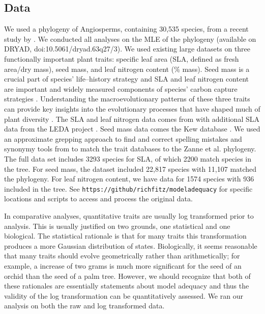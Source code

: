 \documentclass[a4paper,11pt]{article}
\begin{document}
\subsection{Data}
We used a phylogeny of Angiosperms, containing 30,535 species, from a recent study by \citet{Zanne2013}.  We conducted all analyses on the MLE of the phylogeny (available on DRYAD, doi:10.5061/dryad.63q27/3). We used existing large datasets on three functionally important plant traits: specific leaf area (SLA, defined as fresh area/dry mass), seed mass, and leaf nitrogen content (\% mass). Seed mass is a crucial part of species' life--history strategy \citep{Leishman2000, Westoby2002} and SLA and leaf nitrogen content are important and widely measured components of species' carbon capture strategies \citep{Wright2004}. Understanding the macroevolutionary patterns of these three traits can provide key insights into the evolutionary processes that have shaped much of plant diversity \citep{ksi}. The SLA and leaf nitrogen data comes from \citet{Wright2004} with additional SLA data from the LEDA project \citep{Kleyer2008}. Seed mass data comes the Kew database \citep{Kew2008}. We used an approximate grepping approach to find and correct spelling mistakes and synonymy tools from \citet{plantlist} to match the trait databases to the Zanne et al. phylogeny. 
The full data set includes 3293 species for SLA, of which 2200 match species in the \citet{Zanne2013} tree. For seed mass, the dataset included 22,817 species with 11,107 matched the phylogeny. For leaf nitrogen content, we have data for 1574 species with 936 included in the tree. 
%
See \texttt{https://github/richfitz/modeladequacy} for specific locations and scripts to access and process the original data. 

In comparative analyses, quantitative traits are usually log transformed prior to analysis. This is usually justified on two grounds, one statistical and one biological. The statistical rationale is that for many traits this transformation produces a more Gaussian distribution of states. Biologically, it seems reasonable that many traits should evolve geometrically rather than arithmetically; 
for example, a increase of two grams is much more significant for the seed of an orchid than the seed of a palm tree. However, we should recognize that both of these rationales are essentially statements about model adequacy and thus the validity of the log transformation can be quantitatively assessed. We ran our analysis on both the raw and log transformed data.
\end{document}
